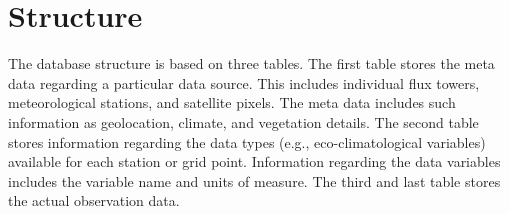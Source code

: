 %
%
%
%
%
\section{Structure}
\label{sec:dbstruc}
The database structure is based on three tables.  
The first table stores the meta data regarding a particular data source.  
This includes individual flux towers, meteorological stations, and satellite pixels.  
The meta data includes such information as geolocation, climate, and vegetation details.  
The second table stores information regarding the data types (e.g., eco-climatological variables) available for each station or grid point.  
Information regarding the data variables includes the variable name and units of measure.  
The third and last table stores the actual observation data.

